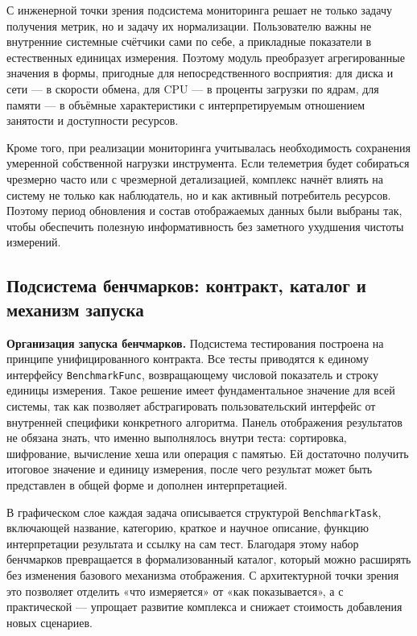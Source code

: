 С инженерной точки зрения подсистема мониторинга решает не только задачу получения метрик, но и задачу их нормализации. Пользователю важны не внутренние системные счётчики сами по себе, а прикладные показатели в естественных единицах измерения. Поэтому модуль преобразует агрегированные значения в формы, пригодные для непосредственного восприятия: для диска и сети --- в скорости обмена, для CPU --- в проценты загрузки по ядрам, для памяти --- в объёмные характеристики с интерпретируемым отношением занятости и доступности ресурсов.

Кроме того, при реализации мониторинга учитывалась необходимость сохранения умеренной собственной нагрузки инструмента. Если телеметрия будет собираться чрезмерно часто или с чрезмерной детализацией, комплекс начнёт влиять на систему не только как наблюдатель, но и как активный потребитель ресурсов. Поэтому период обновления и состав отображаемых данных были выбраны так, чтобы обеспечить полезную информативность без заметного ухудшения чистоты измерений.

\subsection{Подсистема бенчмарков: контракт, каталог и механизм запуска}

\textbf{Организация запуска бенчмарков.} Подсистема тестирования построена на принципе унифицированного контракта. Все тесты приводятся к единому интерфейсу \texttt{BenchmarkFunc}, возвращающему числовой показатель и строку единицы измерения. Такое решение имеет фундаментальное значение для всей системы, так как позволяет абстрагировать пользовательский интерфейс от внутренней специфики конкретного алгоритма. Панель отображения результатов не обязана знать, что именно выполнялось внутри теста: сортировка, шифрование, вычисление хеша или операция с памятью. Ей достаточно получить итоговое значение и единицу измерения, после чего результат может быть представлен в общей форме и дополнен интерпретацией.

В графическом слое каждая задача описывается структурой \texttt{BenchmarkTask}, включающей название, категорию, краткое и научное описание, функцию интерпретации результата и ссылку на сам тест. Благодаря этому набор бенчмарков превращается в формализованный каталог, который можно расширять без изменения базового механизма отображения. С архитектурной точки зрения это позволяет отделить «что измеряется» от «как показывается», а с практической --- упрощает развитие комплекса и снижает стоимость добавления новых сценариев.

